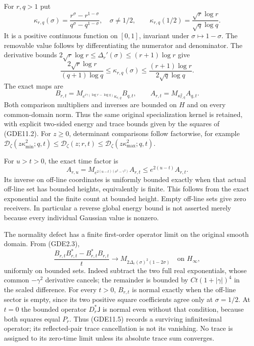 For \(r,q>1\) put \[
\kappa_{r,q}(\sigma)=
\frac{r^\sigma-r^{1-\sigma}}{q^\sigma-q^{1-\sigma}},\quad\sigma\ne1/2,
\qquad
\kappa_{r,q}(1/2)=\frac{\sqrt r\log r}{\sqrt q\log q}.
\tag{GDE11.1}
\] It is a positive continuous function on \([0,1]\), invariant under
\(\sigma\mapsto1-\sigma\). The removable value follows by
differentiating the numerator and denominator. The derivative bounds
\(2\sqrt r\log r\le\Delta_r'(\sigma)\le(r+1)\log r\) give \[
\frac{2\sqrt r\log r}{(q+1)\log q}
\le\kappa_{r,q}(\sigma)
\le\frac{(r+1)\log r}{2\sqrt q\log q}.
\tag{GDE11.2}
\] The exact maps are \[
B_{r,t}=M_{e^{i\gamma(\log r-\log q)}\kappa_{r,q}}B_{q,t},
\qquad A_{r,t}=M_{\kappa_{r,q}^2}A_{q,t}.
\tag{GDE11.3}
\] Both comparison multipliers and inverses are bounded on \(H\) and on
every common-domain norm. Thus the same original specialization kernel
is retained, with explicit two-sided energy and trace bounds given by
the squares of (GDE11.2). For \(z\ge0\), determinant comparisons follow
factorwise, for example \(\mathcal D_\zeta(z\kappa_{\min}^2;q,t)
\le\mathcal D_\zeta(z;r,t)
\le\mathcal D_\zeta(z\kappa_{\max}^2;q,t)\).

For \(u>t>0\), the exact time factor is \[
A_{r,u}=M_{e^{2(u-t)(\sigma^2-\gamma^2)}}A_{r,t}
\le e^{2(u-t)}A_{r,t}.
\tag{GDE11.4}
\] Its inverse on off-line coordinates is uniformly bounded exactly when
that actual off-line set has bounded heights, equivalently is finite.
This follows from the exact exponential and the finite count at bounded
height. Empty off-line sets give zero receivers. In particular a reverse
global energy bound is not asserted merely because every individual
Gaussian value is nonzero.

The normality defect has a finite first-order operator limit on the
original smooth domain. From (GDE2.3), \[
\frac{B_{r,t}B_{r,t}^*-B_{r,t}^*B_{r,t}}t
\longrightarrow M_{2\Delta_r(\sigma)^2(1-2\sigma)}
\quad\text{on }H_\infty,
\tag{GDE11.5}
\] uniformly on bounded sets. Indeed subtract the two full real
exponentials, whose common \(-\gamma^2\) derivative cancels; the
remainder is bounded by \(Ct(1+|\gamma|)^4\) in the scaled difference.
For every \(t>0\), \(B_{r,t}\) is normal exactly when the off-line
sector is empty, since its two positive square coefficients agree only
at \(\sigma=1/2\). At \(t=0\) the bounded operator \(D_r^*\mathsf J\) is
normal even without that condition, because both squares equal \(P_r\).
Thus (GDE11.5) records a surviving infinitesimal operator; its
reflected-pair trace cancellation is not its vanishing. No trace is
assigned to its zero-time limit unless its absolute trace sum converges.

